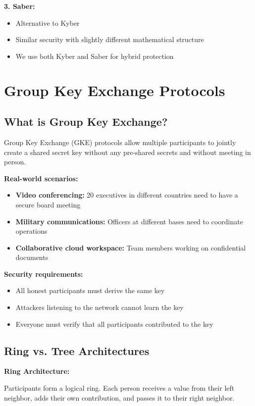 \documentclass[12pt,a4paper]{report}
\begin{document}
\textbf{3. Saber:}
\begin{itemize}
\item Alternative to Kyber
\item Similar security with slightly different mathematical structure
\item We use both Kyber and Saber for hybrid protection
\end{itemize}

\section{Group Key Exchange Protocols}

\subsection{What is Group Key Exchange?}

Group Key Exchange (GKE) protocols allow multiple participants to jointly create a shared secret key without any pre-shared secrets and without meeting in person.

\textbf{Real-world scenarios:}
\begin{itemize}
\item \textbf{Video conferencing:} 20 executives in different countries need to have a secure board meeting
\item \textbf{Military communications:} Officers at different bases need to coordinate operations
\item \textbf{Collaborative cloud workspace:} Team members working on confidential documents
\end{itemize}

\textbf{Security requirements:}
\begin{itemize}
\item All honest participants must derive the same key
\item Attackers listening to the network cannot learn the key
\item Everyone must verify that all participants contributed to the key
\end{itemize}

\subsection{Ring vs. Tree Architectures}

\textbf{Ring Architecture:}

Participants form a logical ring. Each person receives a value from their left neighbor, adds their own contribution, and passes it to their right neighbor.
\end{document}
